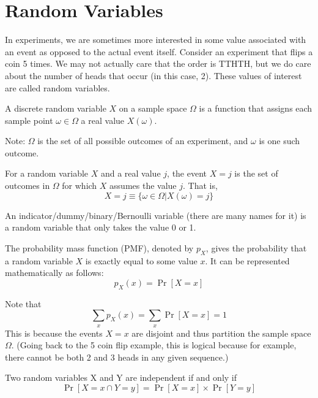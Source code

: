 
\section*{Random Variables}
In experiments, we are sometimes more interested in some value associated with an event as opposed to the actual event itself. Consider an experiment that flips a coin 5 times. We may not actually care that the order is TTHTH, but we do care about the number of heads that occur (in this case, 2). These values of interest are called random variables.

\begin{definition}
    A discrete random variable $X$ on a sample space $\Omega$ is a function that assigns each sample point $\omega \in \Omega$ a real value $X(\omega)$.
\end{definition}

Note: $\Omega$ is the set of all possible outcomes of an experiment, and $\omega$ is one such outcome.

\vspace{2.5mm}

For a random variable $X$ and a real value $j$, the event $X = j$ is the set of outcomes in $\Omega$ for which $X$ assumes the value $j$. That is, 
\[
X = j \equiv \{\omega \in \Omega | X(\omega) = j \}
\]

\begin{definition}
    An indicator/dummy/binary/Bernoulli variable (there are many names for it) is a random variable that only takes the value 0 or 1.
\end{definition}

\begin{definition}
    The probability mass function (PMF), denoted by $p_{X}$, gives the probability that a random variable $X$ is exactly equal to some value $x$. It can be represented mathematically as follows:
    \[
    p_{X}(x) = \Pr[X = x]
    \]
\end{definition}

Note that 
\[
\sum_{x} p_{X}(x) = \sum_{x} \Pr[X = x] = 1
\]
This is because the events $X = x$ are disjoint and thus partition the sample space $\Omega$. (Going back to the 5 coin flip example, this is logical because for example, there cannot be both 2 and 3 heads in any given sequence.)

\begin{definition}
    Two random variables X and Y are independent if and only if
    \[
    \Pr[X = x \cap Y = y] = \Pr[X = x] \times \Pr[Y = y]
    \]
\end{definition}

